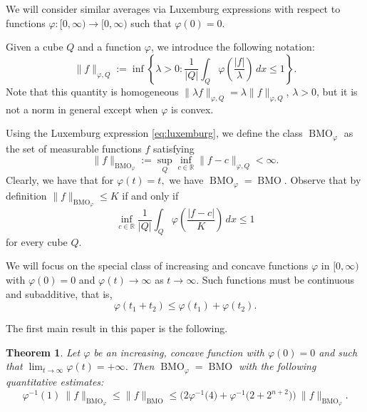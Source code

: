 \documentclass[11pt,a4paper]{amsart}
\newtheorem{theorem}{Theorem}[section]
\theoremstyle{definition}
\theoremstyle{remark}
\numberwithin{equation}{section}
\DeclareMathOperator{\BMO}{BMO}
\numberwithin{equation}{section}
\begin{document}
We will consider similar averages  via Luxemburg expressions with respect to functions $\varphi:[0,\infty)\to[0,\infty)$ such that $\varphi(0)=0$.

Given a cube $Q$ and a function $\varphi$, we introduce the following notation:
%
\begin{equation}\label{eq:luxemburg}
 \|f\|_{\varphi,Q} :=
\inf\left\{  \lambda > 0 : \frac{1}{|Q|}
\int_Q \varphi\left(\frac{|f|}{\lambda}\right)\,dx \leq 1 \right\}.
\end{equation}
%
Note that this quantity is homogeneous  $\|\lambda f\|_{\varphi,Q}=\lambda \|f\|_{\varphi,Q}$, $\lambda>0$,  but it is not a norm in general except when $\varphi$ is convex.


Using the Luxemburg expression \eqref{eq:luxemburg}, we define the  class $\BMO_\varphi$ as the set of measurable functions $f$ satisfying 
%
\begin{equation}\label{eq:BMO_varphi}
\|f\|_{\BMO_\varphi} := \sup_Q\inf_{c\in \mathbb{R}}  \|f-c\|_{\varphi,Q}<\infty.
\end{equation}
%
Clearly, we have that for $\varphi(t)=t,$ we have $\BMO_\varphi=\BMO$.
%
Observe that by definition  $\|f\|_{\BMO_\varphi} \leq K$ if and only if 
%
\begin{equation}\label{propertyhomog}
\inf_{c\in \mathbb{R}}  \frac{1}{|Q|} \int_Q \varphi\left(\frac{|f-c|}{K}\right)\,dx \leq 1
\end{equation}
%
for every cube $Q$.

We will focus on the special class of increasing and concave functions $\varphi$ in $[0,\infty)$ with $\varphi(0)=0$ and $\varphi (t) \rightarrow \infty$ as $t\rightarrow \infty$. Such functions must be continuous and subadditive, that is,
%
\[
\varphi(t_1+t_2) \leq \varphi(t_1) + \varphi(t_2).
\]
%

The first main result in this paper is the following.


\begin{theorem}\label{thm:Main-Cubes}
Let $\varphi$ be an increasing, concave function with $\varphi(0)=0$ and such that $\lim_{t\to \infty}\varphi(t)=+\infty$. Then $\BMO_\varphi=\BMO$ with the following quantitative estimates:
%
\begin{equation*}\label{eq:equiv-norm-Luxemburg}
\varphi^{-1}(1) \: \|f\|_{\BMO_\varphi} \leq \|f\|_{\BMO} \leq \big( 2\varphi^{-1} \big(4) + \varphi^{-1} \big( 2+2^{n+2}\big) \big) \: \|f\|_{\BMO_\varphi}.
\end{equation*}
%


\end{theorem}
\end{document}
